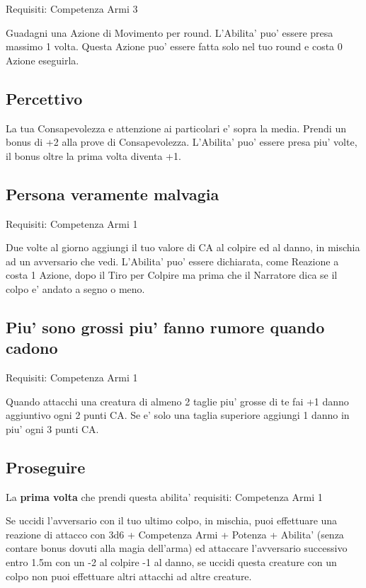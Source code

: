 \documentclass[a4paper,11pt,twoside,openany]{book}
\begin{document}
Requisiti: Competenza Armi 3

Guadagni una Azione di Movimento per round. L'Abilita' puo' essere presa massimo 1 volta. Questa Azione puo' essere fatta solo nel tuo round e costa 0 Azione eseguirla.

\subsection{Percettivo}

La tua Consapevolezza e attenzione ai particolari e' sopra la media.
Prendi un bonus di +2 alla prove di Consapevolezza. L'Abilita' puo'
essere presa piu' volte, il bonus oltre la prima volta diventa +1.

\subsection{Persona veramente malvagia}

Requisiti: Competenza Armi 1

Due volte al giorno aggiungi il tuo valore di CA al colpire ed al danno, in mischia ad un avversario che vedi. L'Abilita' puo' essere dichiarata, come Reazione a costa 1 Azione, dopo il Tiro per Colpire ma prima che il Narratore dica se il colpo e' andato a segno o meno.

\subsection{Piu' sono grossi piu' fanno rumore quando cadono}

Requisiti: Competenza Armi 1

Quando attacchi una creatura di almeno 2 taglie piu' grosse di te fai +1 danno aggiuntivo ogni 2 punti CA. Se e' solo una taglia superiore aggiungi 1 danno in piu' ogni 3 punti CA.

\subsection{Proseguire}

La \textbf{prima volta} che prendi questa abilita' requisiti: Competenza Armi 1

Se uccidi l'avversario con il tuo ultimo colpo, in mischia, puoi effettuare una reazione di attacco con 3d6 + Competenza Armi + Potenza + Abilita' (senza contare bonus dovuti alla magia dell'arma) ed attaccare l'avversario successivo entro 1.5m con un -2 al colpire -1 al danno, se uccidi questa creature con un colpo non puoi effettuare altri attacchi ad altre creature.
\end{document}
